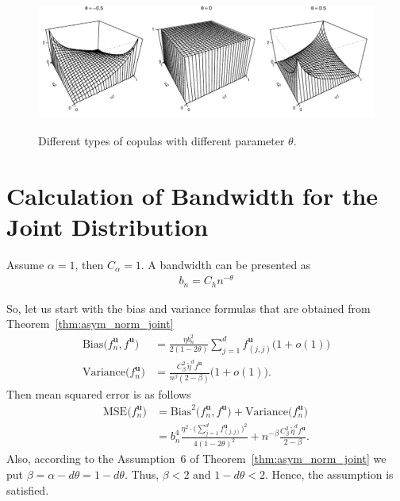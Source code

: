 \documentclass[12pt]{article}
\begin{document}
\begin{figure}
\begin{flushright}
			\includegraphics[width=0.77\linewidth]{plots/copulas/normal}\\
		\end{flushright}
		
		\caption{Different types of copulas with different parameter $ \theta $.}
		\label{fig:copulas}
	\end{figure}
	
	
	
	
	\section{Calculation of Bandwidth for the Joint Distribution}\label{sec:band_joint}
	
	Assume $ \alpha = 1 $, then $ C_\alpha = 1 $. A bandwidth can be presented as
	\begin{align}\label{eq:prod_band}
		b_n = C_h n^{-\theta}
	\end{align}
	
	So, let us start with the bias and variance formulas	that are obtained from Theorem~\ref{thm:asym_norm_joint}
	\begin{align}
		\text{Bias}\big(f_n^{\mathbf{u}}, f^{\mathbf{u}}\big) &= \frac{\eta b_n^2}{2(1-2\theta)} \sum_{j=1}^{d}f^{\mathbf{u}}_{(j,j)}\big(1+o(1)\big) \\
		\text{Variance}\big(f_n^{\mathbf{u}}\big) &= \frac{C_\beta^2\,\widetilde{\eta}^df^{\mathbf{u}}}{n^\beta(2-\beta)} \big(1+o(1)\big).
	\end{align}
	Then mean squared error is as follows
	\begin{align}
		\text{MSE}\big(f_n^{\mathbf{u}}\big) &= \text{Bias}^2\big(f_n^{\mathbf{u}}, f^{\mathbf{u}}\big) + \text{Variance}\big(f_n^{\mathbf{u}}\big) \\
		&= b^4_n \frac{\eta^2\!\cdot \big(\!\sum_{j=1}^{d}f^{\mathbf{u}}_{(j,j)}\big)^2} {4(1-2\theta)^2} + n^{-\beta} \frac{C_\beta^2\, \widetilde{\eta}^df^{\mathbf{u}}}{2-\beta}. \label{eq:mse_2}
	\end{align}
	Also, according to the Assumption~6 of Theorem~\ref{thm:asym_norm_joint} we put $ \beta=\alpha-d\theta=1-d\theta $. Thus, $ \beta < 2 $ and $ 1-d\theta < 2 $. Hence, the assumption is satisfied.
	
\end{document}
